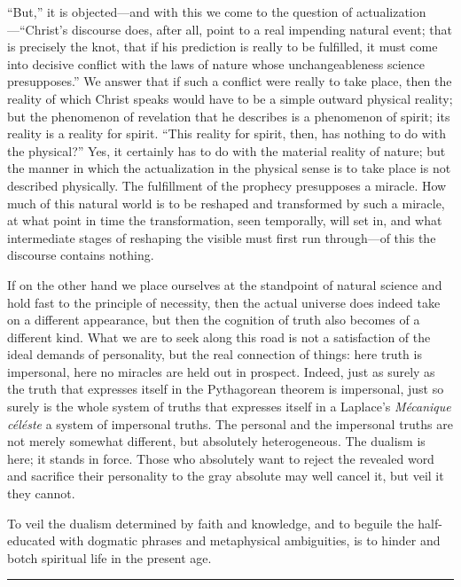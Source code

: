 \documentclass[12pt]{book}
\newcommand{\opage}[1]{\marginnote{\footnotesize\textit{[#1]}}}
\begin{document}
``But,'' it is objected---and with this we come to the question of
actualization---``Christ's discourse does, after all, point to a real
impending natural event; that is precisely the knot, that if his
prediction is really to be fulfilled, it must come into decisive conflict
with the laws of nature whose unchangeableness science presupposes.'' We
answer that if such a conflict were really to take place, then the reality
of which Christ speaks would have to be a simple outward physical reality;
but the phenomenon of revelation that he describes is a phenomenon of
spirit; its
\opage{207}\setcounter{footnote}{0}%
reality is a reality for spirit. ``This reality for spirit, then, has
nothing to do with the physical?'' Yes, it certainly has to do with the
material reality of nature; but the manner in which the actualization in
the physical sense is to take place is not described physically. The
fulfillment of the prophecy presupposes a miracle. How much of this natural
world is to be reshaped and transformed by such a miracle, at what point in
time the transformation, seen temporally, will set in, and what
intermediate stages of reshaping the visible must first run through---of
this the discourse contains nothing.

If on the other hand we place ourselves at the standpoint of natural
science and hold fast to the principle of necessity, then the actual
universe does indeed take on a different appearance, but then the cognition
of truth also becomes of a different kind. What we are to seek along this
road is not a satisfaction of the ideal demands of personality, but the
real connection of things: here truth is impersonal, here no miracles are
held out in prospect. Indeed, just as surely as the truth that expresses
itself in the Pythagorean theorem is impersonal, just so surely is the
whole system of truths that expresses itself in a Laplace's
\textit{Mécanique céléste} a system of impersonal truths. The personal and
the impersonal truths are not merely somewhat different, but absolutely
heterogeneous. The dualism is here; it stands in force. Those who
absolutely want to reject the revealed word and sacrifice their personality
to the gray absolute may well cancel it, but veil it they cannot.

To veil the dualism determined by faith and knowledge, and to beguile the
half-educated with dogmatic phrases and metaphysical ambiguities, is to
hinder and botch spiritual life in the present age.

\begin{center}\rule{3cm}{0.4pt}\end{center}
\end{document}
